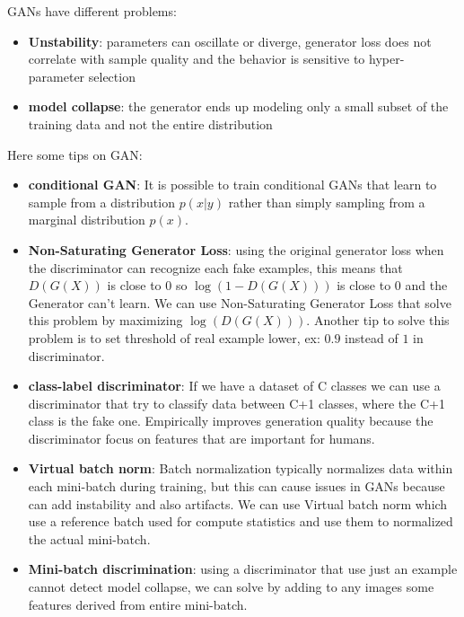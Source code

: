 GANs have different problems:
\begin{itemize}
    \item \textbf{Unstability}: parameters can oscillate or diverge, generator
          loss does not correlate with sample quality and the behavior is sensitive to
          hyper-parameter selection
    \item \textbf{model collapse}: the generator ends up modeling only a small
          subset of the training data and not the entire distribution
\end{itemize}

Here some tips on GAN:
\begin{itemize}
    \item \textbf{conditional GAN}: It is possible to train conditional GANs that learn
          to sample from a distribution $p(x | y)$ rather than simply sampling from a
          marginal distribution $p(x)$.
    \item \textbf{Non-Saturating Generator Loss}: using the original generator loss
          when the discriminator can recognize each fake examples, this means that
          $D(G(X))$ is close to $0$ so $\log(1-D(G(X)))$ is close to 0 and the Generator
          can't learn. We can use Non-Saturating Generator Loss that solve this problem
          by maximizing $\log(D(G(X)))$. Another tip to solve this problem is to set
          threshold of real example lower, ex: $0.9$ instead of $1$ in discriminator.
    \item \textbf{class-label discriminator}: If we have a dataset of C classes
          we can use a discriminator that try to classify data between C+1 classes, where
          the C+1 class is the fake one. Empirically improves generation quality because
          the discriminator focus on features that are important for humans.
    \item \textbf{Virtual batch norm}: Batch normalization typically normalizes
          data within each mini-batch during training, but this can cause issues in GANs
          because can add instability and also artifacts. We can use Virtual batch norm
          which use a reference batch used for compute statistics and use them to normalized
          the actual mini-batch.
    \item \textbf{Mini-batch discrimination}: using a discriminator that use just
          an example cannot detect model collapse, we can solve by adding to any
          images some features derived from entire mini-batch.
\end{itemize}

